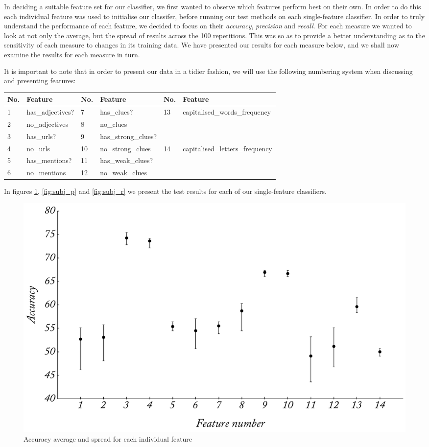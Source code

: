 In deciding a suitable feature set for our classifier, we first wanted to observe which features perform best on their own. In order to do this each individual feature was used to initialise our classifer, before running our test methods on each single-feature classifier. In order to truly understand the performance of each feature, we decided to focus on their \emph{accuracy}, \emph{precision} and \emph{recall}. For each measure we wanted to look at not only the average, but the spread of results across the 100 repetitions. This was so as to provide a better understanding as to the sensitivity of each measure to changes in its training data. We have presented our results for each measure below, and we shall now examine the results for each measure in turn.

It is important to note that in order to present our data in a tidier fashion, we will use the following numbering system when discussing and presenting features:

\begin{longtable}{|p{0.25in}|p{1.05in}|p{0.25in}|p{1.05in}|p{0.25in}|p{1.05in}|}
		\hline
		No. & Feature & No. & Feature & No. & Feature \\
		\hline
		1 & has\-\_adjectives? & 7 & has\-\_clues? & 13 & \multirow{3}{3pt}{capitalised\-\_words\-\_frequency} \\
		\cline{1-4}
    2 & no\-\_adjectives & 8 & no\-\_clues & & \\
		\cline{1-4}
    3 & has\-\_urls? & 9 & has\-\_strong\-\_clues? & & \\
		\hline
    4 & no\-\_urls & 10 & no\-\_strong\-\_clues & 14 & \multirow{3}{3pt}{capitalised\-\_letters\-\_frequency} \\
		\cline{1-4}
    5 & has\-\_mentions? & 11 & has\-\_weak\-\_clues? & & \\
		\cline{1-4}
		6 & no\-\_mentions & 12 & no\-\_weak\-\_clues & & \\
		\hline
\end{longtable}

In figures \ref{fig:subj_a}, \ref{fig:subj_p} and \ref{fig:subj_r} we present the test results for each of our single-feature classifiers.

\begin{figure}
	\caption{Accuracy average and spread for each individual feature}
	\label{fig:subj_a}
	\centering
		\includegraphics[width=1.0\textwidth]{graphs/subj_a.pdf}
\end{figure}

